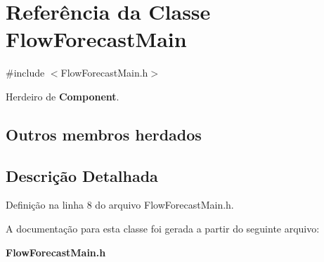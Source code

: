 \section{Referência da Classe Flow\+Forecast\+Main}
\label{class_flow_forecast_main}


{\ttfamily \#include $<$Flow\+Forecast\+Main.\+h$>$}



Herdeiro de {\bf Component}.

\subsection*{Outros membros herdados}


\subsection{Descrição Detalhada}


Definição na linha 8 do arquivo Flow\+Forecast\+Main.\+h.



A documentação para esta classe foi gerada a partir do seguinte arquivo\+:\begin{DoxyCompactItemize}
\item 
{\bf Flow\+Forecast\+Main.\+h}\end{DoxyCompactItemize}
